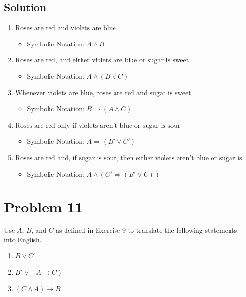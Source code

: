 \documentclass[12pt]{article}
\begin{document}
\subsection*{Solution}
\begin{enumerate}
    \item \( \text{Roses are red and violets are blue} \)
    \begin{itemize}
        \item Symbolic Notation: \( A \land B \)
    \end{itemize}

    \item \( \text{Roses are red, and either violets are blue or sugar is sweet} \)
    \begin{itemize}
        \item Symbolic Notation: \( A \land (B \lor C) \)
    \end{itemize}

    \item \( \text{Whenever violets are blue, roses are red and sugar is sweet} \)
    \begin{itemize}
        \item Symbolic Notation: \( B \Rightarrow (A \land C) \)
    \end{itemize}

    \item \( \text{Roses are red only if violets aren't blue or sugar is sour} \)
    \begin{itemize}
        \item Symbolic Notation: \( A \Rightarrow (B' \lor C') \)
    \end{itemize}

    \item \( \text{Roses are red and, if sugar is sour, then either violets aren't blue or sugar is sweet} \)
    \begin{itemize}
        \item Symbolic Notation: \( A \land (C' \Rightarrow (B' \lor C)) \)
    \end{itemize}
\end{enumerate}



\newpage
\section*{Problem 11}
Use \( A \), \( B \), and \( C \) as defined in Exercise 9 to translate the following statements into English.
\begin{enumerate}
    \item \( B \lor C' \)
    \item \( B' \lor (A \rightarrow C) \)
    \item \( (C \land A) \rightarrow B \)
\end{enumerate}
\newpage
\end{document}
